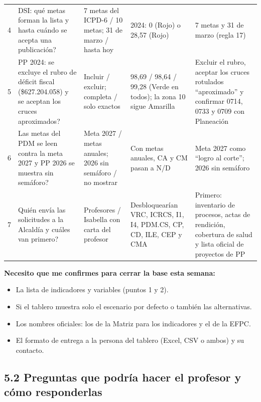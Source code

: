 \documentclass[11pt,letterpaper]{article}
\begin{document}
{\begin{xltabular}{\linewidth}{L{0.61cm}L{4.05cm}L{3.16cm}L{3.66cm}L{4.00cm}}
4 & DSI: \textquestiondown{}qué metas forman la lista y hasta cuándo se acepta una publicación? & 7 metas del ICPD-6 / 10 metas; 31 de marzo / hasta hoy & 2024: 0 (Rojo) o 28,57 (Rojo) & 7 metas y 31 de marzo (regla 17) \\
5 & PP 2024: \textquestiondown{}se excluye el rubro de déficit fiscal (\$627.204.058) y se aceptan los cruces aproximados? & Incluir / excluir; completa / solo exactos & 98,69 / 98,64 / 99,28 (Verde en todos); la zona 10 sigue Amarilla & Excluir el rubro, aceptar los cruces rotulados ``aproximado'' y confirmar 0714, 0733 y 0709 con Planeación \\
6 & \textquestiondown{}Las metas del PDM se leen contra la meta 2027 y PP 2026 se muestra sin semáforo? & Meta 2027 / metas anuales; 2026 sin semáforo / no mostrar & Con metas anuales, CA y CM pasan a N/D & Meta 2027 como ``logro al corte''; 2026 sin semáforo \\
7 & \textquestiondown{}Quién envía las solicitudes a la Alcaldía y cuáles van primero? & Profesores / Isabella con carta del profesor & Desbloquearían VRC, ICRCS, I1, I4, PDM.CS, CP, CD, ILE, CEP y CMA & Primero: inventario de procesos, actas de rendición, cobertura de salud y lista oficial de proyectos de PP \\
\end{xltabular}
}


\textbf{Necesito que me confirmes para cerrar la base esta semana:}

\begin{itemize}
\item La lista de indicadores y variables (puntos 1 y 2).
\item Si el tablero muestra solo el escenario por defecto o también las alternativas.
\item Los nombres oficiales: los de la Matriz para los indicadores y el de la EFPC.
\item El formato de entrega a la persona del tablero (Excel, CSV o ambos) y su contacto.
\end{itemize}

\subsection*{5.2 Preguntas que podría hacer el profesor y cómo responderlas}
\end{document}
